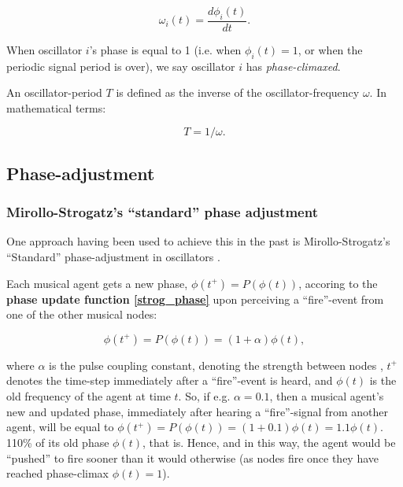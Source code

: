 	\begin{equation}
	\label{phase_freq}
		\omega_i(t) = \frac{d \phi_i(t)}{d t} .
	\end{equation}

	When oscillator $i$'s phase is equal to 1 (i.e. when $\phi_i(t)=1$, or when the periodic signal period is over), we say oscillator $i$ has \textit{phase-climaxed}.
	
	An oscillator-period $T$ is defined as the inverse of the oscillator-frequency $\omega$. In mathematical terms:
	
	\begin{equation}
	\label{period_freq}
		T = 1/\omega .
	\end{equation}
	
	
	\subsection{Phase-adjustment}
	
	
	
	
	
		\subsubsection{Mirollo-Strogatz's ``standard'' phase adjustment} %
		\label{mirollo_strogatz_phase_adjust}
		
		One approach having been used to achieve this in the past is Mirollo-Strogatz's ``Standard'' phase-adjustment in oscillators \cite{mirollo_strogatz_PCO_synch}.
		
		Each musical agent gets a new phase, $\phi(t^+) = P(\phi(t))$, accoring to the \textbf{phase update function \eqref{strog_phase}} upon perceiving a ``fire''-event from one of the other musical nodes:
		
		\begin{equation}
		\label{strog_phase}
			\phi(t^+) = P(\phi(t)) = (1 + \alpha)\phi(t)	,
		\end{equation}
		
		where $\alpha$ is the pulse coupling constant, denoting the strength between nodes \cite{nymoen_synch}, $t^+$ denotes the time-step immediately after a ``fire''-event is heard, and $\phi(t)$ is the old frequency of the agent at time $t$. So, if e.g. $\alpha = 0.1$, then a musical agent's new and updated phase, immediately after hearing a ``fire''-signal from another agent, will be equal to $\phi(t^+) = P(\phi(t)) = (1 + 0.1)\phi(t) = 1.1\phi(t)$. 110\% of its old phase $\phi(t)$, that is. Hence, and in this way, the agent would be ``pushed'' to fire sooner than it would otherwise (as nodes fire once they have reached phase-climax $\phi(t)=1$).
	
